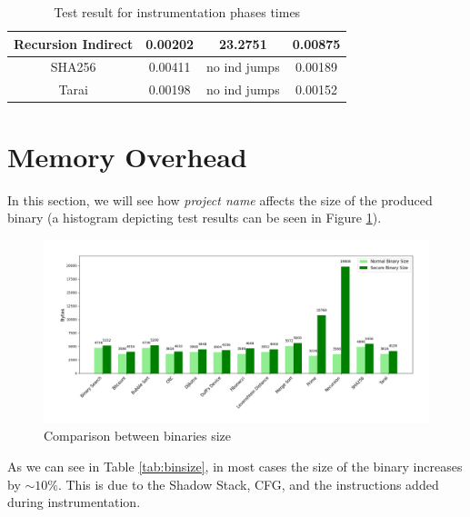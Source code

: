 \begin{table}
\begin{tabular}{|c|c|c|c|}
    \hline
    Recursion Indirect          & 0.00202                      & 23.2751                 & 0.00875                     \\
    \hline
    SHA256                      & 0.00411                      & no ind jumps            & 0.00189                     \\
    \hline
    Tarai                       & 0.00198                      & no ind jumps            & 0.00152                     \\
    \hline
  \end{tabular}
  \caption{Test result for instrumentation phases times}
  \label{tab:othertimes}
\end{table}

\section{Memory Overhead}
\label{sec:pa_memory}

In this section, we will see how \textit{project name} affects the size of the
produced binary (a histogram depicting test results can be seen in Figure \ref{fig:binsize}).

\begin{figure}[htbp]
  \centering
  \includegraphics[width=.9\linewidth]{images/bin_sizes.png}
  \caption{Comparison between binaries size}
  \label{fig:binsize}
\end{figure}

As we can see in Table \ref{tab:binsize}, in most cases the size of the binary
increases by $\sim 10\%$. This is due to the Shadow Stack, CFG, and the instructions
added during instrumentation.

